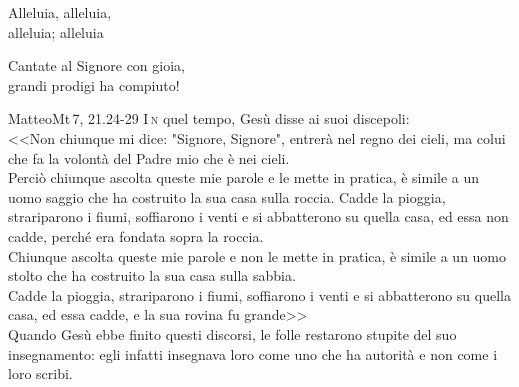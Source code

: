 \documentclass[11pt]{book}
\begin{document}
\settowidth{\versewidth}{Alleluia alleluia alleluia alleluia}
\begin{canzone}%
\begin{ritornello}
Alleluia, alleluia,\\
alleluia; alleluia\\
\end{ritornello}

Cantate al Signore con gioia,\\
grandi prodigi ha compiuto!
\end{canzone}
\begin{vangelo}{Matteo}{Mt\,7, 21.24-29}
\lettrine[lines=3]{I}{\,n} quel tempo, Gesù disse ai suoi discepoli:\\
<<Non chiunque mi dice: "Signore, Signore", entrerà nel regno dei cieli, ma colui che fa la volontà del Padre mio che è nei cieli.\\

Perciò chiunque ascolta queste mie parole e le mette  in pratica, è simile a un uomo saggio che ha costruito la sua casa sulla roccia. Cadde la pioggia, strariparono i fiumi, soffiarono i venti e si abbatterono su quella casa, ed essa non cadde, perché era fondata sopra la roccia.\\

Chiunque ascolta queste mie parole e non le mette in pratica, è simile a un uomo stolto che ha costruito la sua casa sulla sabbia.\\
Cadde la pioggia, strariparono i fiumi, soffiarono i venti e si abbatterono su quella casa, ed essa cadde, e la sua rovina fu grande>>\\

Quando Gesù ebbe finito questi discorsi, le folle restarono stupite del suo insegnamento: egli infatti insegnava loro come uno che ha autorità e non come i loro scribi.
\end{vangelo}

\matrintro
\medskip

\matrpre
\medskip

\consintro
\medskip

\promesse
\medskip

\preghpost


\benedizioneanelli

\medskip
\end{document}

